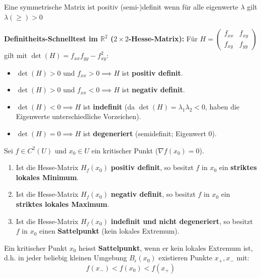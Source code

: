 \begin{remark}
    Eine symmetrische Matrix ist positiv (semi-)definit wenn für alle eigenwerte $\lambda$ gilt $\lambda (\geq)\gt 0$
\end{remark}

\begin{remark}
    \textbf{Definitheits-Schnelltest im $\mathbb{R}^2$ ($2 \times 2$-Hesse-Matrix):} Für $H = \begin{pmatrix} f_{xx} & f_{xy} \\ f_{xy} & f_{yy} \end{pmatrix}$ gilt mit $\det(H) = f_{xx} f_{yy} - f_{xy}^2$:
    \begin{itemize}
        \item $\det(H) > 0$ und $f_{xx} > 0 \implies H$ ist \textbf{positiv definit}.
        \item $\det(H) > 0$ und $f_{xx} < 0 \implies H$ ist \textbf{negativ definit}.
        \item $\det(H) < 0 \implies H$ ist \textbf{indefinit} (da $\det(H) = \lambda_1 \lambda_2 < 0$, haben die Eigenwerte unterschiedliche Vorzeichen).
        \item $\det(H) = 0 \implies H$ ist \textbf{degeneriert} (semidefinit; Eigenwert 0).
    \end{itemize}
\end{remark}

\begin{theorem}
    Sei $f \in C^2(U)$ und $x_0 \in U$ ein kritischer Punkt ($\nabla f(x_0) = 0$).
    \begin{enumerate}
        \item Ist die Hesse-Matrix $H_f(x_0)$ \textbf{positiv definit}, so besitzt $f$ in $x_0$ ein \textbf{striktes lokales Minimum}.
        \item Ist die Hesse-Matrix $H_f(x_0)$ \textbf{negativ definit}, so besitzt $f$ in $x_0$ ein \textbf{striktes lokales Maximum}.
        \item Ist die Hesse-Matrix $H_f(x_0)$ \textbf{indefinit und nicht degeneriert}, so besitzt $f$ in $x_0$ einen \textbf{Sattelpunkt} (kein lokales Extremum).
    \end{enumerate}
\end{theorem}

\begin{definition}
    Ein kritischer Punkt $x_0$ heisst \textbf{Sattelpunkt}, wenn er kein lokales Extremum ist, d.h. in jeder beliebig kleinen Umgebung $B_\epsilon(x_0)$ existieren Punkte $x_+, x_-$ mit:
    $$ f(x_-) < f(x_0) < f(x_+) $$
\end{definition}



